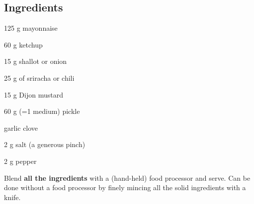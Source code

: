 \newpage
{}

	\subsection*{Ingredients}
	\begin{ingredients}
		\item 125 g mayonnaise
		\item 60 g ketchup
		\item 15 g shallot or onion
		\item 25 g of sriracha or chili
		\item 15 g Dijon mustard
		\item 60 g (=1 medium) pickle
		\item {} garlic clove
		\item 2 g salt (a generous pinch)
		\item 2 g pepper
	\end{ingredients}

\medskip

Blend \textbf{all the ingredients} with a (hand-held) food processor and serve. 
Can be done without a food processor by finely mincing all the solid ingredients with a knife. 


\vspace*{0.75 cm}

\begin{recipeblock}
	
\end{recipeblock}
